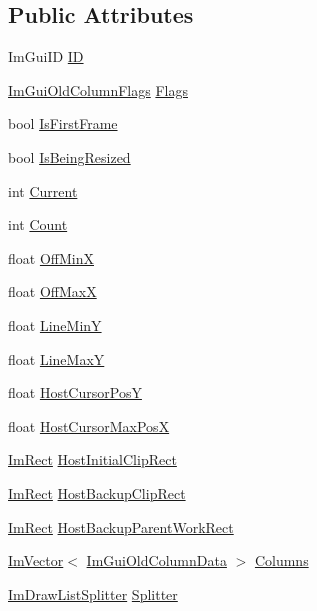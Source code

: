 \subsection*{Public Attributes}
\begin{DoxyCompactItemize}
\item 
Im\+Gui\+ID \hyperlink{structImGuiOldColumns_ae8e14ed159e758560d196a9012ea617d}{ID}
\item 
\hyperlink{imgui__internal_8h_a930931ec4c54582a278a461676df4dda}{Im\+Gui\+Old\+Column\+Flags} \hyperlink{structImGuiOldColumns_aaf37a990d000be9d6d16181edbe1072c}{Flags}
\item 
bool \hyperlink{structImGuiOldColumns_a8597134957b8c1f01b97256978f4b7a1}{Is\+First\+Frame}
\item 
bool \hyperlink{structImGuiOldColumns_a32cc845e4100c21a9cd197d7627a3dd5}{Is\+Being\+Resized}
\item 
int \hyperlink{structImGuiOldColumns_acb97d32d656cf8e96f707e998a107689}{Current}
\item 
int \hyperlink{structImGuiOldColumns_abdbf31a5bf080613d279e149b3c372b6}{Count}
\item 
float \hyperlink{structImGuiOldColumns_a7cbfefcc82a7ca3271c8c0c05cfe9ed4}{Off\+MinX}
\item 
float \hyperlink{structImGuiOldColumns_a19f636d31c2c93d1afe01d9484936b28}{Off\+MaxX}
\item 
float \hyperlink{structImGuiOldColumns_a3b9c843a034e82543a7936e30442704c}{Line\+MinY}
\item 
float \hyperlink{structImGuiOldColumns_a7ba6bbc0231a94ba8c2edcc5029f0d53}{Line\+MaxY}
\item 
float \hyperlink{structImGuiOldColumns_acc41fca916c812950aeb6d479ad4f5f1}{Host\+Cursor\+PosY}
\item 
float \hyperlink{structImGuiOldColumns_a82502dcabe70b52e0e89cbb0b55e7087}{Host\+Cursor\+Max\+PosX}
\item 
\hyperlink{structImRect}{Im\+Rect} \hyperlink{structImGuiOldColumns_aaaaa00e20d7b72ac75c9deea4f09ce15}{Host\+Initial\+Clip\+Rect}
\item 
\hyperlink{structImRect}{Im\+Rect} \hyperlink{structImGuiOldColumns_aa4554860fcb988d5c667d6d7d70d5484}{Host\+Backup\+Clip\+Rect}
\item 
\hyperlink{structImRect}{Im\+Rect} \hyperlink{structImGuiOldColumns_af2350babd38168dc2a605474b6b8aae4}{Host\+Backup\+Parent\+Work\+Rect}
\item 
\hyperlink{structImVector}{Im\+Vector}$<$ \hyperlink{structImGuiOldColumnData}{Im\+Gui\+Old\+Column\+Data} $>$ \hyperlink{structImGuiOldColumns_ab4f542da960ccad64557fe388a8f82eb}{Columns}
\item 
\hyperlink{structImDrawListSplitter}{Im\+Draw\+List\+Splitter} \hyperlink{structImGuiOldColumns_a0bbefb48400e92ca8245dd62bdea7de3}{Splitter}
\end{DoxyCompactItemize}


